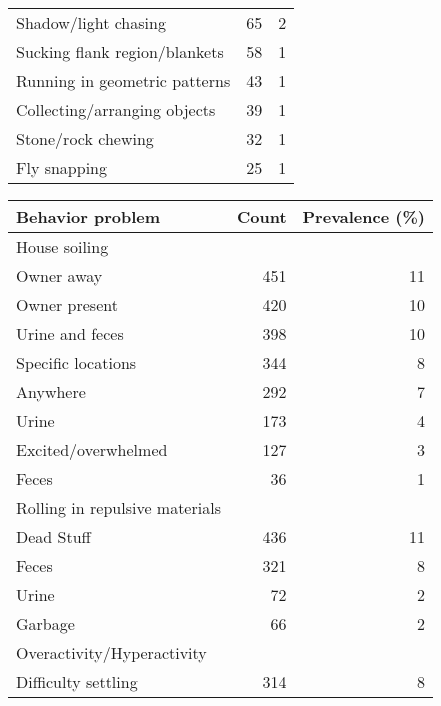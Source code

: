 \documentclass[varwidth=\maxdimen]{standalone}
\newcommand{\subrow}[1]{\hspace{1.25em}#1}
\begin{document}
\begin{tabular}[t]{lrr}
  \subrow{Shadow/light chasing}                &       65 &            2 \\
  \subrow{Sucking flank region/blankets}       &       58 &            1 \\
  \subrow{Running in geometric patterns}       &       43 &            1 \\
  \subrow{Collecting/arranging objects}        &       39 &            1 \\
  \subrow{Stone/rock chewing}                  &       32 &            1 \\
  \subrow{Fly snapping}                        &       25 &            1 \\
\bottomrule
\end{tabular}
\begin{tabular}[t]{lrr}
\toprule
Behavior problem &  Count &  Prevalence (\%) \\
\midrule
House soiling \\
  \subrow{Owner away}                          &      451 &           11 \\
  \subrow{Owner present}                       &      420 &           10 \\
  \subrow{Urine and feces}                     &      398 &            10 \\
  \subrow{Specific locations}                  &      344 &            8 \\
  \subrow{Anywhere}                            &      292 &            7 \\
  \subrow{Urine}                               &      173 &            4 \\
  \subrow{Excited/overwhelmed}                 &      127 &            3 \\
  \subrow{Feces}                               &       36 &            1 \\
Rolling in repulsive materials \\
  \subrow{Dead Stuff}                          &      436 &           11 \\
  \subrow{Feces}                               &      321 &            8 \\
  \subrow{Urine}                               &       72 &            2 \\
  \subrow{Garbage}                             &       66 &            2 \\
Overactivity/Hyperactivity \\
  \subrow{Difficulty settling}                 &      314 &            8 \\

\end{tabular}
\end{document}
